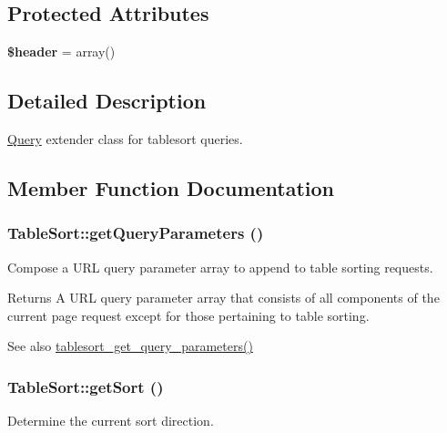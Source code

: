 \subsection*{Protected Attributes}
\begin{DoxyCompactItemize}
\item 
\hypertarget{classTableSort_acb8e4cc090e460f9f1827d6a67a56c68}{
{\bfseries \$header} = array()}
\label{classTableSort_acb8e4cc090e460f9f1827d6a67a56c68}

\end{DoxyCompactItemize}


\subsection{Detailed Description}
\hyperlink{classQuery}{Query} extender class for tablesort queries. 

\subsection{Member Function Documentation}
\hypertarget{classTableSort_ae490f3120363a9bde624de4d94c02862}{
\subsubsection[{getQueryParameters}]{\setlength{\rightskip}{0pt plus 5cm}TableSort::getQueryParameters ()}}
\label{classTableSort_ae490f3120363a9bde624de4d94c02862}
Compose a URL query parameter array to append to table sorting requests.

\begin{DoxyReturn}{Returns}
A URL query parameter array that consists of all components of the current page request except for those pertaining to table sorting.
\end{DoxyReturn}
\begin{DoxySeeAlso}{See also}
\hyperlink{tablesort_8inc_a25f3317225870d1ed7dea582f57dd950}{tablesort\_\-get\_\-query\_\-parameters()} 
\end{DoxySeeAlso}
\hypertarget{classTableSort_a600bbe2947b4d9059ebda2c24dfdf223}{
\subsubsection[{getSort}]{\setlength{\rightskip}{0pt plus 5cm}TableSort::getSort ()}}
\label{classTableSort_a600bbe2947b4d9059ebda2c24dfdf223}
Determine the current sort direction.


